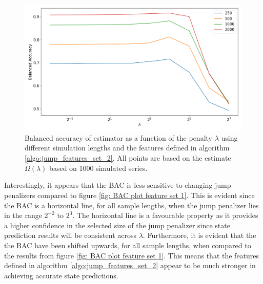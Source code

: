 \begin{figure}[H] 
    \centering
    \includegraphics[width=1\textwidth]{analysis/model_convergence/images/jump_penalties_feature_set_2.png}
    \caption[Balanced accuracy of \jump estimator using feature set 2]{Balanced accuracy of \jump estimator as a function of the penalty $\lambda$ using different simulation lengths and the features defined in algorithm \ref{algo:jump_features_set_2}. All points are based on the estimate $\hat{\Omega} (\lambda)$ based on 1000 simulated series.}
    \label{fig: BAC plot feature set 2}
\end{figure}

Interestingly, it appears that the BAC is less sensitive to changing jump penalizers compared to figure \ref{fig: BAC plot feature set 1}. This is evident since the BAC is a horizontal line, for all sample lengths, when the jump penalizer lies in the range $2^{-2}$ to $2^3$. The horizontal line is a favourable property as it provides a higher confidence in the selected size of the jump penalizer since state prediction results will be consistent across $\lambda$. Furthermore, it is evident that the the BAC have been shifted upwards, for all sample lengths, when compared to the results from figure \ref{fig: BAC plot feature set 1}. This means that the features defined in algorithm \ref{algo:jump_features_set_2} appear to be much stronger in achieving accurate state predictions. 

